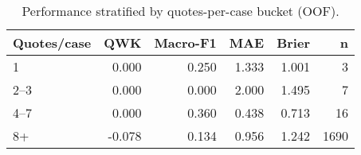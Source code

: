 \begin{table}
\caption{Performance stratified by quotes-per-case bucket (OOF).}
\label{tab:robustness-qpc}
\begin{tabular}{lrrrrr}
\toprule
Quotes/case & QWK & Macro-F1 & MAE & Brier & n \\
\midrule
1 & 0.000 & 0.250 & 1.333 & 1.001 & 3 \\
2–3 & 0.000 & 0.000 & 2.000 & 1.495 & 7 \\
4–7 & 0.000 & 0.360 & 0.438 & 0.713 & 16 \\
8+ & -0.078 & 0.134 & 0.956 & 1.242 & 1690 \\
\bottomrule
\end{tabular}
\end{table}
